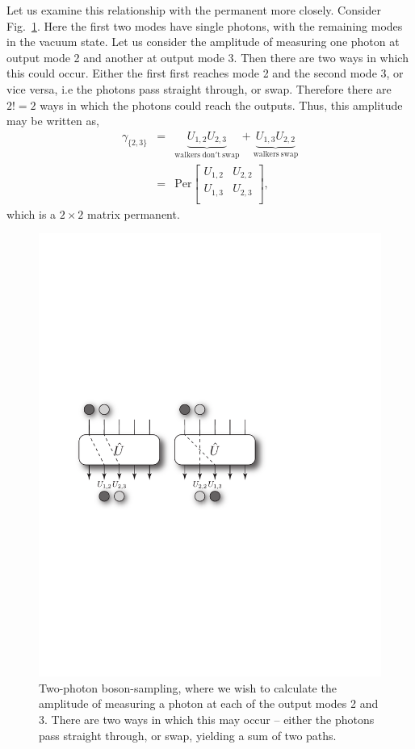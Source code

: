 \documentclass[aps,pra,twocolumn,amsmath,amssymb,nofootinbib,superscriptaddress]{revtex4}
\begin{document}
Let us examine this relationship with the permanent more closely. Consider Fig.~\ref{fig:two_photon_perm}. Here the first two modes have single photons, with the remaining modes in the vacuum state. Let us consider the amplitude of measuring one photon at output mode 2 and another at output mode 3. Then there are two ways in which this could occur. Either the first first reaches mode 2 and the second mode 3, or vice versa, i.e the photons pass straight through, or swap. Therefore there are $2!=2$ ways in which the photons could reach the outputs. Thus, this amplitude may be written as,
\begin{eqnarray} \label{eq:coinProbEx}
\gamma_{\{2,3\}} &=& \underbrace{U_{1,2}U_{2,3}}_{\mathrm{walkers\ don't\ swap}} + \underbrace{U_{1,3}U_{2,2}}_{\mathrm{walkers\ swap}} \nonumber \\
&=& \mathrm{Per} \left[ {\begin{array}{cc}
   U_{1,2} & U_{2,2} \\
   U_{1,3} & U_{2,3} \\
  \end{array} } \right],
\end{eqnarray}
which is a \mbox{$2\times 2$} matrix permanent.

\begin{figure}[!htb]
\includegraphics[width=0.7\columnwidth]{two_photon_combinatorics}
\caption{Two-photon boson-sampling, where we wish to calculate the amplitude of measuring a photon at each of the output modes 2 and 3. There are two ways in which this may occur -- either the photons pass straight through, or swap, yielding a sum of two paths.} \label{fig:two_photon_perm}
\end{figure}
\end{document}
